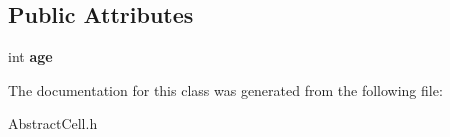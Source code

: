 \subsection*{\-Public \-Attributes}
\begin{DoxyCompactItemize}
\item 
\hypertarget{classFredkinCell_a755dea54626a9742e4dad6a03755706b}{int {\bfseries age}}\label{classFredkinCell_a755dea54626a9742e4dad6a03755706b}

\end{DoxyCompactItemize}


\-The documentation for this class was generated from the following file\-:\begin{DoxyCompactItemize}
\item 
\-Abstract\-Cell.\-h\end{DoxyCompactItemize}
